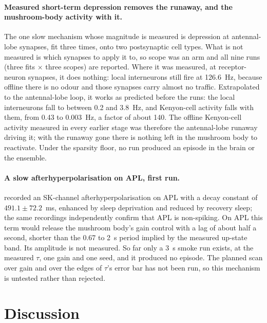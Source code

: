 \documentclass[11pt]{article}
\begin{document}
\paragraph{Measured short-term depression removes the runaway, and the mushroom-body activity with it.} The one slow mechanism whose magnitude is measured is depression at antennal-lobe synapses, fit three times, onto two postsynaptic cell types. What is not measured is which synapses to apply it to, so scope was an arm and all nine runs (three fits $\times$ three scopes) are reported. Where it was measured, at receptor-neuron synapses, it does nothing: local interneurons still fire at 126.6~Hz, because offline there is no odour and those synapses carry almost no traffic. Extrapolated to the antennal-lobe loop, it works as predicted before the runs: the local interneurons fall to between 0.2 and 3.8~Hz, and Kenyon-cell activity falls with them, from 0.43 to 0.003~Hz, a factor of about 140. The offline Kenyon-cell activity measured in every earlier stage was therefore the antennal-lobe runaway driving it; with the runaway gone there is nothing left in the mushroom body to reactivate. Under the sparsity floor, no run produced an episode in the brain or the ensemble.

\paragraph{A slow afterhyperpolarisation on APL, first run.} \citet{chen2026} recorded an SK-channel afterhyperpolarisation on APL with a decay constant of $491.1 \pm 72.2$~ms, enhanced by sleep deprivation and reduced by recovery sleep; the same recordings independently confirm that APL is non-spiking. On APL this term would release the mushroom body's gain control with a lag of about half a second, shorter than the 0.67 to 2~s period implied by the measured up-state band. Its amplitude is not measured. So far only a 3~s smoke run exists, at the measured $\tau$, one gain and one seed, and it produced no episode. The planned scan over gain and over the edges of $\tau$'s error bar has not been run, so this mechanism is untested rather than rejected.

\section{Discussion}
\end{document}
